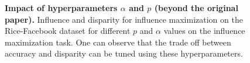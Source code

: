 \begin{figure}[!htbp]
    \centering
\caption{\textbf{Impact of hyperparameters $\alpha$ and $p$ (beyond the original paper).} Influence and disparity for influence maximization on the Rice-Facebook dataset for different $p$ and $\alpha$ values on the influence maximization task. One can observe that the trade off between accuracy and disparity can be tuned using these hyperparameters.}
\label{fig:paramsweep}
\end{figure}






